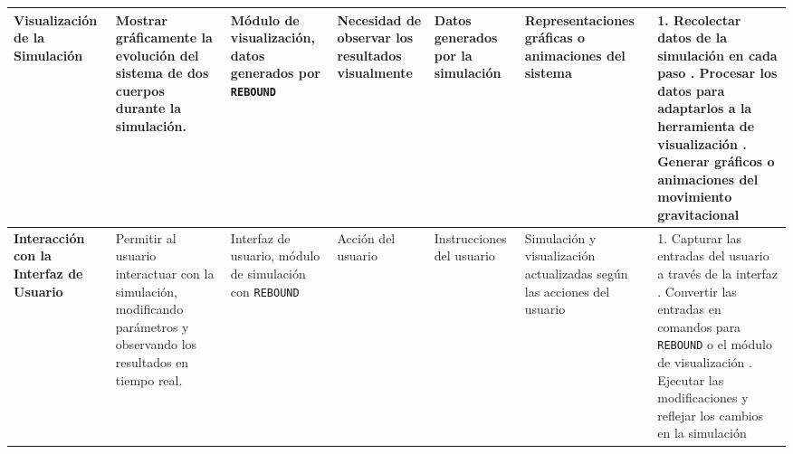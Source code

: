 \begin{table}[H]
\begin{adjustbox}{max width=\textwidth}
\begin{tabular}{@{}p{5cm} p{3cm} p{2.5cm} p{2.5cm} p{2.5cm} p{3cm} p{4cm}@{}}
            \midrule
            \textbf{Visualización de la Simulación} & Mostrar gráficamente la evolución del sistema de dos cuerpos durante la simulación. & Módulo de visualización, datos generados por \texttt{REBOUND} & Necesidad de observar los resultados visualmente & Datos generados por la simulación & Representaciones gráficas o animaciones del sistema & 1. Recolectar datos de la simulación en cada paso \newline 2. Procesar los datos para adaptarlos a la herramienta de visualización \newline 3. Generar gráficos o animaciones del movimiento gravitacional \\
            \midrule
            \textbf{Interacción con la Interfaz de Usuario} & Permitir al usuario interactuar con la simulación, modificando parámetros y observando los resultados en tiempo real. & Interfaz de usuario, módulo de simulación con \texttt{REBOUND} & Acción del usuario & Instrucciones del usuario & Simulación y visualización actualizadas según las acciones del usuario & 1. Capturar las entradas del usuario a través de la interfaz \newline 2. Convertir las entradas en comandos para \texttt{REBOUND} o el módulo de visualización \newline 3. Ejecutar las modificaciones y reflejar los cambios en la simulación \\
            \bottomrule
        \end{tabular}
    \end{adjustbox}
\end{table}

